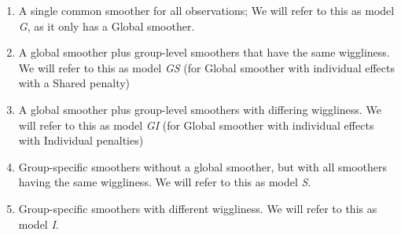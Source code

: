 \documentclass[12pt]{article}
\providecommand{\tightlist}{%
  \setlength{\itemsep}{0pt}\setlength{\parskip}{0pt}}
\begin{document}
\begin{enumerate}
\def\labelenumi{\arabic{enumi}.}
\tightlist
\item
  A single common smoother for all observations; We will refer to this
  as model \emph{G}, as it only has a Global smoother.
\item
  A global smoother plus group-level smoothers that have the same
  wiggliness. We will refer to this as model \emph{GS} (for Global
  smoother with individual effects with a Shared penalty)
\item
  A global smoother plus group-level smoothers with differing
  wiggliness. We will refer to this as model \emph{GI} (for Global
  smoother with individual effects with Individual penalties)
\item
  Group-specific smoothers without a global smoother, but with all
  smoothers having the same wiggliness. We will refer to this as model
  \emph{S}.
\item
  Group-specific smoothers with different wiggliness. We will refer to
  this as model \emph{I}.
\end{enumerate}
\end{document}
